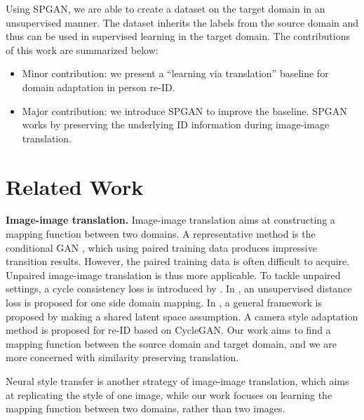 \documentclass[10pt,twocolumn,letterpaper]{article}
\begin{document}
Using SPGAN, we are able to create a dataset on the target domain in an unsupervised manner. The dataset inherits the labels from the source domain and thus can be used in supervised learning in the target domain. The contributions of this work are summarized below:
\begin{itemize}
\item Minor contribution: we present a ``learning via translation'' baseline for domain adaptation in person re-ID.
\item Major contribution: we introduce SPGAN to improve the baseline. SPGAN works by preserving the underlying ID information during image-image translation.
\end{itemize}

\section{Related Work} \label{Related Works}
\textbf{Image-image translation.} 
Image-image translation aims at constructing a mapping function between two domains. A representative method is the conditional GAN \cite{DBLP:journals/corr/IsolaZZE16}, which using paired training data produces impressive transition results. However, the paired training data is often difficult to acquire. Unpaired image-image translation is thus more applicable. To tackle unpaired settings, a cycle consistency loss is introduced by \cite{DiscoGAN, DualGAN, cycle}. In \cite{DBLP:journals/corr/BenaimW17}, an unsupervised distance loss is proposed for one side domain mapping. In \cite{DBLP:journals/corr/LiuBK17}, a general framework is proposed by making a shared latent space assumption. A camera style adaptation method \cite{zhong2018camera} is proposed for re-ID based on CycleGAN.
Our work aims to find a mapping function between the source domain and target domain, and we are more concerned with similarity preserving translation.

Neural style transfer \cite{DBLP:conf/cvpr/GatysEB16, DBLP:conf/eccv/LiW16, DBLP:conf/icml/UlyanovLVL16, DBLP:conf/eccv/JohnsonAF16, DBLP:journals/corr/ChenS16f, DBLP:journals/corr/LiFYWL017, DBLP:journals/corr/HuangB17, DBLP:conf/ijcai/LiWLH17} is another strategy of image-image translation, which aims at replicating the style of one image, while our work focuses on learning the mapping function between two domains, rather than two images. 
\end{document}
